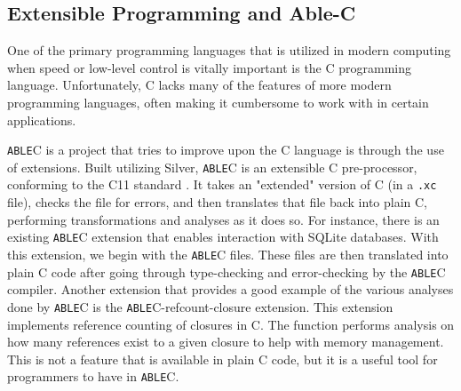 \documentclass[main.tex]{subfiles}
\begin{document}
\subsection{Extensible Programming and Able-C} %
One of the primary programming languages that is utilized in modern computing
when speed or low-level control is vitally important is the C programming
language. Unfortunately, C lacks many of the features of more modern programming
languages, often making it cumbersome to work with in certain applications.

\verb|ABLE|C \cite{9} is a project that tries to improve upon the C language is through the use
of extensions. Built utilizing Silver, \verb|ABLE|C is an 
extensible C pre-processor, conforming to the C11 standard \cite{8}. It takes an
"extended" version of C (in a \verb|.xc| file), checks the file for errors, and then translates that
file back into plain C, performing
transformations and analyses as it does so. For instance, there is an existing %
\verb|ABLE|C extension that enables interaction with SQLite databases. With this
extension, we begin with the \verb|ABLE|C files. These files are then translated
into plain C code after going through type-checking and error-checking by the
\verb|ABLE|C compiler. %
Another extension that provides a good example of the various analyses done by
\verb|ABLE|C is the \verb|ABLE|C-refcount-closure extension. This extension
implements reference counting of closures in C. The function performs analysis
on how many references exist to a given closure to help with memory management.
This is not a feature that is available in plain C code, but it is a useful tool for
programmers to have in \verb|ABLE|C.
\end{document}
